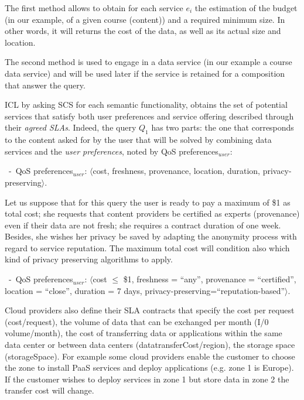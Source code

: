  

The first method allows to obtain for each service $e_i$ the estimation of the budget (in our example, of a given course (content)) and a required minimum size. In other words, it will returns the cost of the data, as well as its actual size and location.
 
The second method is used to engage in a data service (in our example a course data service) and will be used later if the service is retained for a composition that answer the query.

 

ICL by asking SCS for each semantic functionality, obtains the set of potential services that satisfy both user preferences and  service offering described through their \textit{agreed SLAs}. 
Indeed, the query $Q_1$ has two parts: the one that corresponds to the content asked for by the user  that will be solved by combining data services and the \textit{user preferences}, noted by {QoS preferences}$_\mathit{user}$:
\begin{trivlist}\sf\footnotesize
\item[~-~QoS preferences$_\mathit{user}$: ] $\langle$cost, freshness, provenance, location, duration, privacy-preserving$\rangle$. 
\end{trivlist}

 

Let us suppose that for this query the user is ready to pay a maximum of \$1 as total cost; she requests that content providers be certified as experts (provenance) even if their data are not fresh; she requires a contract duration of one week. Besides, she wishes her privacy be saved by adapting the anonymity process with regard to service reputation. The maximum total cost will condition also which kind of privacy preserving algorithms to apply.
 
\begin{trivlist}\sf\footnotesize
\item[~-~QoS preferences$_\mathit{user}$: ] $\langle$cost $\leq$ \$1, freshness = ``any'', provenance = ``certified'', location = ``close'', duration = 7 days, privacy-preserving=``reputation-based''$\rangle$. 
\end{trivlist}



Cloud providers also define their SLA contracts that specify the cost per request ({cost/request}), the volume of data that can be exchanged per month ({I/0 volume/month}), the cost of transferring data or applications within the same data center or between data centers ({datatransferCost/region}), the storage space ({storageSpace}). For example some cloud providers enable the customer to choose the zone to install PaaS services and deploy applications (e.g. zone 1 is Europe). If the customer wishes to deploy services in zone 1 but store data in zone 2 the transfer cost will change.

